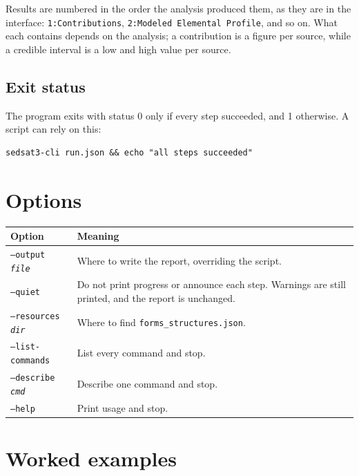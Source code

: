 \documentclass[11pt,a4paper]{report}
\begin{document}
Results are numbered in the order the analysis produced them, as they are in
the interface: \texttt{1:Contributions}, \texttt{2:Modeled Elemental Profile},
and so on. What each contains depends on the analysis; a contribution is a
figure per source, while a credible interval is a low and high value per
source.

\section{Exit status}

The program exits with status 0 only if every step succeeded, and 1 otherwise.
A script can rely on this:

\begin{lstlisting}
sedsat3-cli run.json && echo "all steps succeeded"
\end{lstlisting}

\chapter{Options}

\begin{longtable}{@{}p{}p{}@{}}
\toprule
\textbf{Option} & \textbf{Meaning} \\
\midrule
\endfirsthead
\texttt{--output \textit{file}} & Where to write the report, overriding the
  script. \\
\addlinespace
\texttt{--quiet} & Do not print progress or announce each step. Warnings are
  still printed, and the report is unchanged. \\
\addlinespace
\texttt{--resources \textit{dir}} & Where to find
  \texttt{forms\_structures.json}. \\
\addlinespace
\texttt{--list-commands} & List every command and stop. \\
\addlinespace
\texttt{--describe \textit{cmd}} & Describe one command and stop. \\
\addlinespace
\texttt{--help} & Print usage and stop. \\
\bottomrule
\end{longtable}

\chapter{Worked examples}
\end{document}
